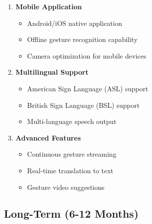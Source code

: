 \begin{enumerate}
    \item \textbf{Mobile Application}
    \begin{itemize}
        \item Android/iOS native application
        \item Offline gesture recognition capability
        \item Camera optimization for mobile devices
    \end{itemize}
    
    \item \textbf{Multilingual Support}
    \begin{itemize}
        \item American Sign Language (ASL) support
        \item British Sign Language (BSL) support
        \item Multi-language speech output
    \end{itemize}
    
    \item \textbf{Advanced Features}
    \begin{itemize}
        \item Continuous gesture streaming
        \item Real-time translation to text
        \item Gesture video suggestions
    \end{itemize}
\end{enumerate}

\subsection{Long-Term (6-12 Months)}


